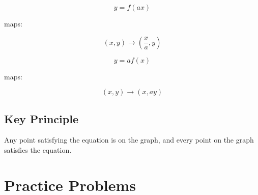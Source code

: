 \documentclass[11pt]{article}
\begin{document}
\[
y=f(ax)
\]

maps:

\[
(x,y)\rightarrow\left(\frac{x}{a},y\right)
\]

\vspace{0.3cm}

\[
y=af(x)
\]

maps:

\[
(x,y)\rightarrow(x,ay)
\]

\subsection*{Key Principle}

Any point satisfying the equation is on the graph, and every point on the graph satisfies the equation.

\newpage

\section*{Practice Problems}
\end{document}
